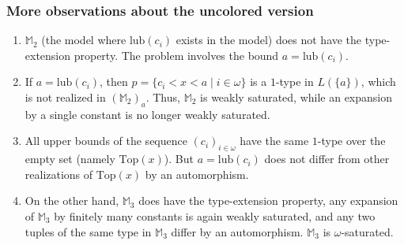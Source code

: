 \documentclass[t,xcolor=dvipsnames,handout]{beamer}
\theoremstyle{theoremFermat}
\theoremstyle{reimann}
\theoremstyle{ACExample}
\begin{document}
\begin{frame} 
  \frametitle{More observations about the uncolored version}

\pause

\begin{enumerate}
\item $\mathbb M_2$ \pause
  (the model where $\textrm{lub}(c_i)$ exists in the model) \pause
  does not have the type-extension
  property. \pause
The problem involves the bound $a = \textrm{lub}(c_i)$. \pause
\item If $a=\textrm{lub}(c_i)$,
  then $p=\{c_i<x<a\;|\;i\in\omega\}$ is a
  $1$-type in $L(\{a\})$, which is not realized
  in $(\mathbb M_2)_a$. \pause
  Thus, $\mathbb M_2$ is weakly saturated, while
  an expansion by a single constant is no longer
  weakly saturated. \pause
\item All upper bounds of the sequence $(c_i)_{i\in\omega}$
  have the same $1$-type over the empty set \pause
  (namely $\textrm{Top}(x)$). \pause
  But $a = \textrm{lub}(c_i)$ does not differ from
  other realizations of $\textrm{Top}(x)$ by an automorphism. \pause
\item On the other hand, $\mathbb M_3$ does have the type-extension
  property, \pause any expansion of $\mathbb M_3$ by finitely
  many constants is again weakly saturated, \pause
  and any two tuples of the same type
  in $\mathbb M_3$ differ by an automorphism. \pause
  $\mathbb M_3$ is $\omega$-saturated.
\end{enumerate}

\end{frame}
\end{document}
